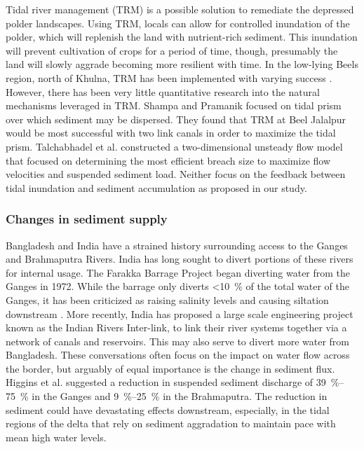 \documentclass{wscpaperproc}
\theoremstyle{wsc}
\begin{document}
Tidal river management (TRM) is a possible solution to remediate the depressed polder landscapes. Using TRM, locals can allow for controlled inundation of the polder, which will replenish the land with nutrient-rich sediment. This inundation will prevent cultivation of crops for a period of time, though, presumably the land will slowly aggrade becoming more resilient with time. In the low-lying Beels region, north of Khulna, TRM has been implemented with varying success \cite{khadimIntegratedWaterResources2013a,shampaTidalRiverManagement2012,vanstaverenBringingTidesClosing2017}. However, there has been very little quantitative research into the natural mechanisms leveraged in TRM. Shampa and Pramanik \cite{shampaTidalRiverManagement2012} focused on tidal prism over which sediment may be dispersed. They found that TRM at Beel Jalalpur would be most successful with two link canals in order to maximize the tidal prism. Talchabhadel et al. \cite{talchabhadelExperimentalStudyTidal2017} constructed a two-dimensional unsteady flow model that focused on determining the most efficient breach size to maximize flow velocities and suspended sediment load. Neither focus on the feedback between tidal inundation and sediment accumulation as proposed in our study.

\subsubsection*{Changes in sediment supply}

Bangladesh and India have a strained history surrounding access to the Ganges and Brahmaputra Rivers. India has long sought to divert portions of these rivers for internal usage. The Farakka Barrage Project began diverting water from the Ganges in 1972. While the barrage only diverts \SI{<10}{\percent} of the total water of the Ganges, it has been criticized as raising salinity levels and causing siltation downstream \cite{gainImpactFarakkaDam2014}. More recently, India has proposed a large scale engineering project known as the Indian Rivers Inter-link, to link their river systems together via a network of canals and reservoirs. This may also serve to divert more water from Bangladesh. These conversations often focus on the impact on water flow across the border, but arguably of equal importance is the change in sediment flux. Higgins et al. \cite{higginsRiverLinkingIndia2018}  suggested a reduction in suspended sediment discharge of \SIrange{39}{75}{\percent} in the Ganges and \SIrange{9}{25}{\percent} in the Brahmaputra. The reduction in sediment could have devastating effects downstream, especially, in the tidal regions of the delta that rely on sediment aggradation to maintain pace with mean high water levels.
\end{document}
